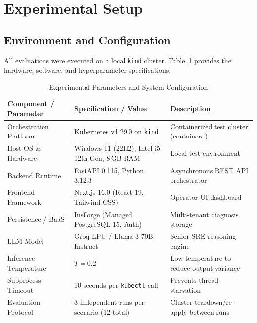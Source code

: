 \documentclass[12pt,onecolumn,draftclsnofoot]{IEEEtran}
\begin{document}
\section{Experimental Setup}

\subsection{Environment and Configuration}
All evaluations were executed on a local \texttt{kind} cluster. Table~\ref{tab:params} provides the hardware, software, and hyperparameter specifications.

\begin{table}[h]
\caption{Experimental Parameters and System Configuration}
\label{tab:params}
\centering
\small
\begin{tabular}{lll}
\toprule
\textbf{Component / Parameter} & \textbf{Specification / Value} & \textbf{Description} \\
\midrule
Orchestration Platform & Kubernetes v1.29.0 on \texttt{kind} & Containerized test cluster (containerd) \\
Host OS \& Hardware & Windows 11 (22H2), Intel i5-12th Gen, 8\,GB RAM & Local test environment \\
Backend Runtime & FastAPI 0.115, Python 3.12.3 & Asynchronous REST API orchestrator \\
Frontend Framework & Next.js 16.0 (React 19, Tailwind CSS) & Operator UI dashboard \\
Persistence / BaaS & InsForge (Managed PostgreSQL 15, Auth) & Multi-tenant diagnosis storage \\
LLM Model & Groq LPU / Llama-3-70B-Instruct & Senior SRE reasoning engine \\
Inference Temperature & $T = 0.2$ & Low temperature to reduce output variance \\
Subprocess Timeout & 10 seconds per \texttt{kubectl} call & Prevents thread starvation \\
Evaluation Protocol & 3 independent runs per scenario (12 total) & Cluster teardown/re-apply between runs \\
\bottomrule
\end{tabular}
\end{table}
\end{document}
